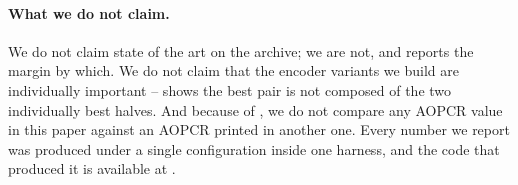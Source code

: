 \paragraph{What we do not claim.}
We do not claim state of the art on the \ucr{} archive; we are not, and  reports the
margin by which. We do not claim that the encoder variants we build are individually important --
 shows the best pair is not composed of the two individually best halves. And
because of , we do not compare any AOPCR value in this paper against an AOPCR
printed in another one. Every number we report was produced under a single configuration inside one
harness, and the code that produced it is available at \anonrepo{}.

